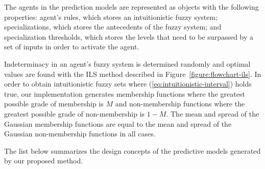 \documentclass{ieeeaccess}
\begin{document}



The agents in the prediction models are represented as objects with the following properties: agent's rules, which stores an intuitionistic fuzzy system; specializations, which stores the antecedents of the fuzzy system; and specialization thresholds, which stores the levels that need to be surpassed by a set of inputs in order to activate the agent.

Indeterminacy in an agent's fuzzy system is determined randomly and optimal values are found with the ILS method described in Figure~\ref{figure:flowchart-ils}. In order to obtain intuitionistic fuzzy sets where (\ref{eq:intuitionistic-interval}) holds true, our implementation generates membership functions where the greatest possible grade of membership is $M$ and non-membership functions where the greatest possible grade of non-membership is $1 - M$. The mean and spread of the Gaussian membership functions are equal to the mean and spread of the Gaussian non-membership functions in all cases.


The list below summarizes the design concepts of the predictive models
generated by our proposed method.
\end{document}
